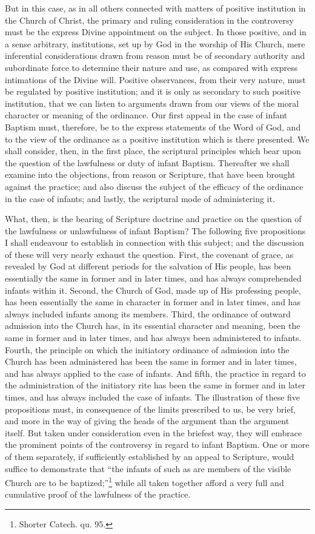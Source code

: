 \documentclass[english,]{book}
\begin{document}
But in this case, as in all others connected with matters of positive institution in the Church of Christ, the primary and ruling consideration in the controversy must be the express Divine appointment on the subject. In those positive, and in a sense arbitrary, institutions, set up by God in the worship of His Church, mere inferential considerations drawn from reason must be of secondary authority and subordinate force to determine their nature and use, as compared with express intimations of the Divine will. Positive observances, from their very nature, must be regulated by positive institution; and it is only as secondary to such positive institution, that we can listen to arguments drawn from our views of the moral character or meaning of the ordinance. Our first appeal in the case of infant Baptism must, therefore, be to the express statements of the Word of God, and to the view of the ordinance as a positive institution which is there presented. We shall consider, then, in the first place, the scriptural principles which bear upon the question of the lawfulness or duty of infant Baptism. Thereafter we shall examine into the objections, from reason or Scripture, that have been brought against the practice; and also discuss the subject of the efficacy of the ordinance in the case of infants; and lastly, the scriptural mode of administering it.

What, then, is the bearing of Scripture doctrine and practice on the question of the lawfulness or unlawfulness of infant Baptism? The following five propositions I shall endeavour to establish in connection with this subject; and the discussion of these will very nearly exhaust the question. First, the covenant of grace, as revealed by God at different periods for the salvation of His people, has been essentially the same in former and in later times, and has always comprehended infants within it. Second, the Church of God, made up of His professing people, has been essentially the same in character in former and in later times, and has always included infants among its members. Third, the ordinance of outward admission into the Church has, in its essential character and meaning, been the same in former and in later times, and has always been administered to infants. Fourth, the principle on which the initiatory ordinance of admission into the Church has been administered has been the same in former and in later times, and has always applied to the case of infants. And fifth, the practice in regard to the administration of the initiatory rite has been the same in former and in later times, and has always included the case of infants. The illustration of these five propositions must, in consequence of the limits prescribed to us, be very brief, and more in the way of giving the heads of the argument than the argument itself. But taken under consideration even in the briefest way, they will embrace the prominent points of the controversy in regard to infant Baptism. One or more of them separately, if sufficiently established by an appeal to Scripture, would suffice to demonstrate that ``the infants of such as are members of the visible Church are to be baptized;''\footnote{Shorter Catech. qu. 95.} while all taken together afford a very full and cumulative proof of the lawfulness of the practice.
\end{document}

